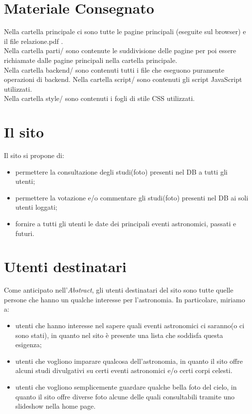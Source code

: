 	\section{Materiale Consegnato}
	Nella cartella principale ci sono tutte le pagine principali (eseguite sul browser) e il file relazione.pdf . \\
	Nella cartella parti/ sono contenute le suddivisione delle pagine per poi essere richiamate dalle pagine principali nella cartella principale.\\
	Nella cartella backend/ sono contenuti tutti i file che eseguono puramente operazioni di backend.
	Nella cartella script/ sono contenuti gli script JavaScript utilizzati.\\
	Nella cartella style/ sono contenuti i fogli di stile CSS utilizzati.
	\section{Il sito}
	
	Il sito si propone di:
	\begin{itemize}
		\item permettere la consultazione degli studi(foto) presenti nel DB a tutti gli utenti;
		\item permettere la votazione e/o commentare gli studi(foto) presenti nel DB ai soli utenti loggati;
		\item fornire a tutti gli utenti le date dei principali eventi astronomici, passati e futuri.
	\end{itemize}
	\section{Utenti destinatari}
	Come anticipato nell'\textit{Abstract}, gli utenti destinatari del sito sono tutte quelle persone che hanno un qualche interesse per l'astronomia.
	In particolare, miriamo a:
	\begin{itemize}
		\item utenti che hanno interesse nel sapere quali eventi astronomici ci saranno(o ci sono stati), in quanto nel sito è presente una lista che soddisfa questa esigenza;
		\item utenti che vogliono imparare qualcosa dell'astronomia, in quanto il sito offre alcuni studi divulgativi su certi eventi astronomici e/o certi corpi celesti.
		\item utenti che vogliono semplicemente guardare qualche bella foto del cielo, in quanto il sito offre diverse foto alcune delle quali consultabili tramite uno slideshow nella home page.
		
	\end{itemize}

